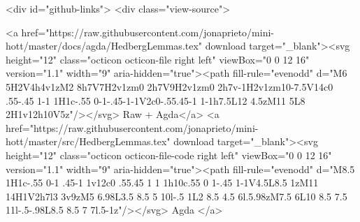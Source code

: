   <div id="github-links">
    <div class="view-source">
      
        <a href="https://raw.githubusercontent.com/jonaprieto/mini-hott/master/docs/agda/HedbergLemmas.tex" download target="_blank"><svg height="12" class="octicon octicon-file right left" viewBox="0 0 12 16" version="1.1" width="9" aria-hidden="true"><path fill-rule="evenodd" d="M6 5H2V4h4v1zM2 8h7V7H2v1zm0 2h7V9H2v1zm0 2h7v-1H2v1zm10-7.5V14c0 .55-.45 1-1 1H1c-.55 0-1-.45-1-1V2c0-.55.45-1 1-1h7.5L12 4.5zM11 5L8 2H1v12h10V5z"/></svg> Raw + Agda</a>
        <a href="https://raw.githubusercontent.com/jonaprieto/mini-hott/master/src/HedbergLemmas.tex" download target="_blank"><svg height="12" class="octicon octicon-file-code right left" viewBox="0 0 12 16" version="1.1" width="9" aria-hidden="true"><path fill-rule="evenodd" d="M8.5 1H1c-.55 0-1 .45-1 1v12c0 .55.45 1 1 1h10c.55 0 1-.45 1-1V4.5L8.5 1zM11 14H1V2h7l3 3v9zM5 6.98L3.5 8.5 5 10l-.5 1L2 8.5 4.5 6l.5.98zM7.5 6L10 8.5 7.5 11l-.5-.98L8.5 8.5 7 7l.5-1z"/></svg> Agda </a>
      

